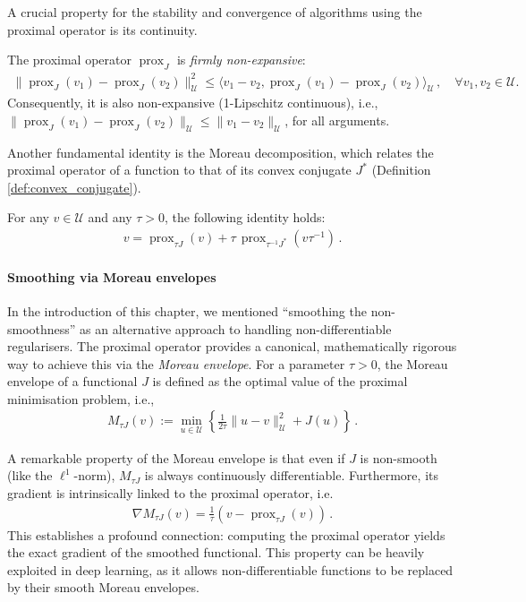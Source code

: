 A crucial property for the stability and convergence of algorithms using the proximal operator is its continuity.

\begin{prop}\label{prop:firm_non_expansive}\normalfont
The proximal operator $\operatorname{prox}_{J}$ is \emph{firmly non-expansive}:
\begin{align*}
\|\operatorname{prox}_{J}(v_1) - \operatorname{prox}_{J}(v_2)\|_\mathcal{U}^2 \leq \langle v_1 - v_2, \operatorname{prox}_{J}(v_1) - \operatorname{prox}_{J}(v_2) \rangle_\mathcal{U} \, , \quad \forall v_1, v_2 \in \mathcal{U}.
\end{align*}
Consequently, it is also non-expansive (1-Lipschitz continuous), i.e., $\|\operatorname{prox}_{J}(v_1) - \operatorname{prox}_{J}(v_2)\|_\mathcal{U} \leq \|v_1 - v_2\|_\mathcal{U}$, for all arguments.
\end{prop}

Another fundamental identity is the Moreau decomposition, which relates the proximal operator of a function to that of its convex conjugate $J^*$ (Definition \ref{def:convex_conjugate}).

\begin{thm}\label{thm:moreau_decomposition}\normalfont
For any $v \in \mathcal{U}$ and any $\tau > 0$, the following identity holds:
\begin{align*}
v = \operatorname{prox}_{\tau J}(v) + \tau \, \operatorname{prox}_{\tau^{-1} J^*}(v \tau^{-1}) \, .
\end{align*}
\end{thm}

\paragraph{Smoothing via Moreau envelopes}
In the introduction of this chapter, we mentioned ``smoothing the non-smoothness'' as an alternative approach to handling non-differentiable regularisers. The proximal operator provides a canonical, mathematically rigorous way to achieve this via the \emph{Moreau envelope}. For a parameter $\tau > 0$, the Moreau envelope of a functional $J$ is defined as the optimal value of the proximal minimisation problem, i.e.,
\begin{align*}
M_{\tau J}(v) := \min_{u \in \mathcal{U}} \left\{ \frac{1}{2\tau}\|u - v\|_{\mathcal{U}}^2 + J(u) \right\} \, .
\end{align*}

A remarkable property of the Moreau envelope is that even if $J$ is non-smooth (like the $\ell^1$-norm), $M_{\tau J}$ is always continuously differentiable. Furthermore, its gradient is intrinsically linked to the proximal operator, i.e.
\begin{align*}
\nabla M_{\tau J}(v) = \frac{1}{\tau} (v - \operatorname{prox}_{\tau J}(v)) \, .
\end{align*}
This establishes a profound connection: computing the proximal operator yields the exact gradient of the smoothed functional. This property can be heavily exploited in deep learning, as it allows non-differentiable functions to be replaced by their smooth Moreau envelopes.

